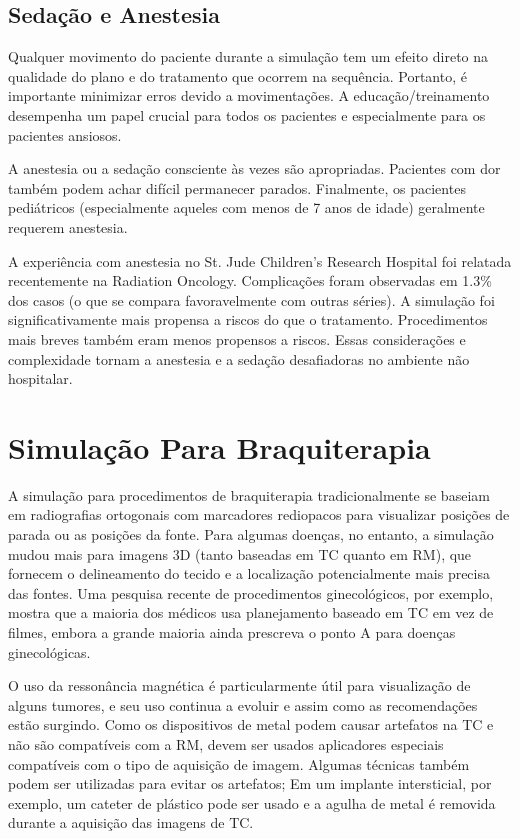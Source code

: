 \documentclass[11pt,a4paper]{article}
\newcounter{exemplo}
\begin{document}
\subsection*{Sedação e Anestesia}

	Qualquer movimento do paciente durante a simulação tem um efeito direto na qualidade do plano e do tratamento que ocorrem na sequência. Portanto, é importante minimizar erros devido a movimentações. A educação/treinamento desempenha um papel crucial para todos os pacientes e especialmente para os pacientes ansiosos.

	A anestesia ou a sedação consciente às vezes são apropriadas. Pacientes com dor também podem achar difícil permanecer parados. Finalmente, os pacientes pediátricos (especialmente aqueles com menos de 7 anos de idade) geralmente requerem anestesia. 
	
	A experiência com anestesia no St. Jude Children's Research Hospital foi relatada recentemente na  Radiation Oncology. Complicações foram observadas em 1.3\% dos casos (o que se compara favoravelmente com outras séries). A simulação foi significativamente mais propensa a riscos do que o tratamento. Procedimentos mais breves também eram menos propensos a riscos. Essas considerações e complexidade tornam a anestesia e a sedação desafiadoras no ambiente não hospitalar. 

\section{Simulação Para Braquiterapia}

	A simulação para procedimentos de braquiterapia tradicionalmente se baseiam em radiografias ortogonais com marcadores rediopacos para visualizar posições de parada ou as posições da fonte. Para algumas doenças, no entanto, a simulação mudou mais para imagens 3D (tanto baseadas em TC quanto em RM), que fornecem o delineamento do tecido e a localização potencialmente mais precisa das fontes. Uma pesquisa recente de procedimentos ginecológicos, por exemplo, mostra que a maioria dos médicos usa planejamento baseado em TC em vez de filmes, embora a grande maioria ainda prescreva o ponto A para doenças ginecológicas.
	
	O uso da ressonância magnética é particularmente útil para visualização de alguns tumores, e seu uso continua a evoluir e assim como as recomendações estão surgindo. Como os dispositivos de metal podem causar artefatos na TC e não são compatíveis com a RM, devem ser usados aplicadores especiais compatíveis com o tipo de aquisição de imagem. Algumas técnicas também podem ser utilizadas para evitar os artefatos; Em um implante intersticial, por exemplo, um cateter de plástico pode ser usado e a agulha de metal é removida durante a aquisição das imagens de TC.
\end{document}
